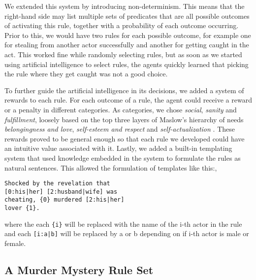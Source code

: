 We extended this system by introducing non-determinism. This means that the right-hand side may list multiple sets of predicates that are all possible outcomes of activating this rule, together with a probability of each outcome occurring. Prior to this, we would have two rules for each possible outcome, for example one for stealing from another actor successfully and another for getting caught in the act. This worked fine while randomly selecting rules, but as soon as we started using artificial intelligence to select rules, the agents quickly learned that picking the rule where they get caught was not a good choice.

To further guide the artificial intelligence in its decisions, we added a system of rewards to each rule. For each outcome of a rule, the agent could receive a reward or a penalty in different categories.
As categories, we chose \emph{social}, \emph{sanity} and \emph{fulfillment}, loosely based on the top three layers of Maslow's hierarchy of needs \emph{belongingness and love}, \emph{self-esteem and respect} and \emph{self-actualization} \cite{maslow_1943}.
These rewards proved to be general enough so that each rule we developed could have an intuitive value associated with it.
Lastly, we added a built-in templating system that used knowledge embedded in the system to formulate the rules as natural sentences.
This allowed the formulation of templates like this:,
\begin{lstlisting}
Shocked by the revelation that
[0:his|her] [2:husband|wife] was
cheating, {0} murdered [2:his|her]
lover {1}.
\end{lstlisting}
where the each \lstinline|{i}| will be replaced with the name of the i-th actor in the rule and each \lstinline{[i:a|b]} will be replaced by a or b depending on if i-th actor is male or female.

\subsection{A Murder Mystery Rule Set}


